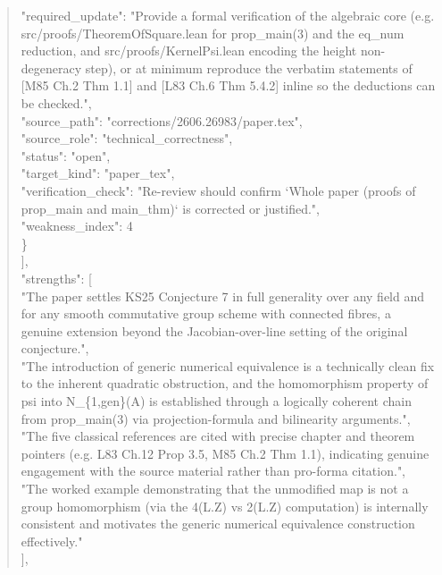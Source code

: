 \documentclass[11pt]{article}
\begin{document}
\begin{quote}
      "required\_update": "Provide a formal verification of the algebraic core (e.g. src/proofs/TheoremOfSquare.lean for prop\_main(3) and the eq\_num reduction, and src/proofs/KernelPsi.lean encoding the height non-degeneracy step), or at minimum reproduce the verbatim statements of [M85 Ch.2 Thm 1.1] and [L83 Ch.6 Thm 5.4.2] inline so the deductions can be checked.",\\
      "source\_path": "corrections/2606.26983/paper.tex",\\
      "source\_role": "technical\_correctness",\\
      "status": "open",\\
      "target\_kind": "paper\_tex",\\
      "verification\_check": "Re-review should confirm `Whole paper (proofs of prop\_main and main\_thm)` is corrected or justified.",\\
      "weakness\_index": 4\\
    \}\\
  ],\\
  "strengths": [\\
    "The paper settles KS25 Conjecture 7 in full generality over any field and for any smooth commutative group scheme with connected fibres, a genuine extension beyond the Jacobian-over-line setting of the original conjecture.",\\
    "The introduction of generic numerical equivalence is a technically clean fix to the inherent quadratic obstruction, and the homomorphism property of psi into N\_\{1,gen\}(A) is established through a logically coherent chain from prop\_main(3) via projection-formula and bilinearity arguments.",\\
    "The five classical references are cited with precise chapter and theorem pointers (e.g. L83 Ch.12 Prop 3.5, M85 Ch.2 Thm 1.1), indicating genuine engagement with the source material rather than pro-forma citation.",\\
    "The worked example demonstrating that the unmodified map is not a group homomorphism (via the 4(L.Z) vs 2(L.Z) computation) is internally consistent and motivates the generic numerical equivalence construction effectively."\\
  ],\\

\end{quote}
\end{document}
